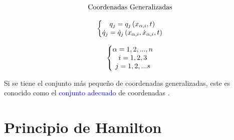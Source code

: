 \documentclass[/home/hernan/Documentos/Apuntes_mecanica_teorica/main.tex]{subfiles}
\begin{document}
\begin{definition}
\begin{equation*}
\begin{matrix}
                \begin{matrix}
                    \textup{Coordenadas Generalizadas} \\ 
                    \\ 
                    \left\{\begin{matrix}
                                q_{j} = q_{j} \left ( x_{\alpha,i}, t \right )\\ 
                                \dot{q}_{j} = \dot{q}_{j} \left ( x_{\alpha,i}, \dot{x}_{\alpha,i} , t\right )
                            \end{matrix}\right .
                
                \end{matrix} 
                \\ 
                \\ 
                \left\{\begin{matrix}
                            \alpha = 1,2,...,n\\ 
                            i= 1,2,3\\ 
                            j= 1,2,...s
                        \end{matrix}\right .
            \end{matrix}
        \end{equation*}

        Si se tiene el conjunto más pequeño de coordenadas generalizadas, este es conocido como el \textcolor{blue}{conjunto adecuado} de coordenadas .
    \end{definition}


    \begin{definition}
        
    \end{definition}

    \begin{definition}
        
    \end{definition}

    \section{Principio de Hamilton}

    \begin{definition}

        
    \end{definition}
\end{document}
